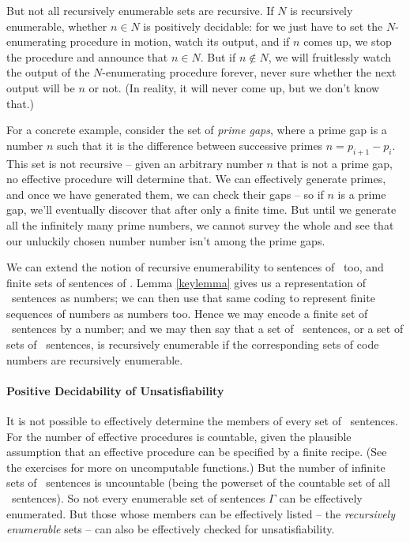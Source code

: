 But not all recursively enumerable sets are recursive. If $N$ is recursively enumerable, whether $n\in N$ is positively decidable: for we just have to set the $N$-enumerating procedure in motion, watch its output, and if $n$ comes up, we stop the procedure and announce that $n\in N$. But if $n\notin N$, we will fruitlessly watch the output of the $N$-enumerating procedure forever, never sure whether the next output will be $n$ or not. (In reality, it will never come up, but we don't know that.)

For a concrete example, consider the set of \emph{prime gaps}, where a prime gap is a number $n$ such that it is the difference between successive primes $n = p_{i+1}-p_{i}$. This set is not recursive – given an arbitrary number $n$ that is not a prime gap, no effective procedure will determine that. We can effectively generate primes, and once we have generated them, we can check their gaps – so if $n$ is a prime gap, we'll eventually discover that after only a finite time. But until we generate all the infinitely many prime numbers, we cannot survey the whole and see that our unluckily chosen number number isn't among the prime gaps.

We can extend the notion of recursive enumerability to sentences of \lone\ too, and finite sets of sentences of \lone. Lemma \ref{keylemma} gives us a representation of \lone\ sentences as numbers; we can then use that same coding to represent finite sequences of numbers as numbers too. Hence we may encode a finite set of \lone\ sentences by a number; and we may then say that a set of \lone\ sentences, or a set of sets of \lone\ sentences, is recursively enumerable if the corresponding sets of code numbers are recursively enumerable.



\paragraph{Positive Decidability of Unsatisfiability}  It is not possible to effectively determine the members of every set of \lone\ sentences. For the number of effective procedures is countable, given the plausible assumption that an effective procedure can be specified by a finite recipe. (See the exercises for more on uncomputable functions.) But the number of infinite sets of \lone\ sentences is uncountable (being the powerset of the countable set of all \lone\ sentences).  So not every enumerable set of sentences $\Gamma$ can be effectively enumerated. But those whose members can be effectively listed – the \emph{recursively enumerable} sets – can also be effectively checked for unsatisfiability. 

